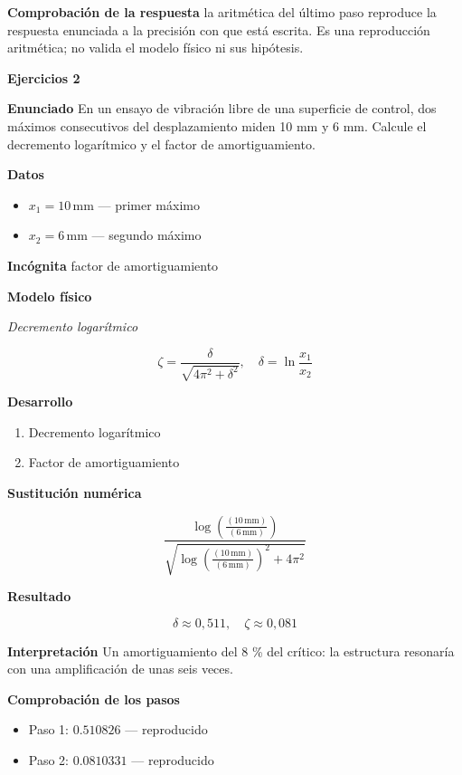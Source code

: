 \documentclass[10pt,openany]{book}
\begin{document}
\noindent\textbf{Comprobación de la respuesta} la aritmética del último paso reproduce la respuesta enunciada a la precisión con que está escrita. Es una reproducción aritmética; no valida el modelo físico ni sus hipótesis.

\noindent\textbf{Ejercicios 2}

\noindent\textbf{Enunciado}
En un ensayo de vibración libre de una superficie de control, dos máximos consecutivos del desplazamiento miden 10 mm y 6 mm. Calcule el decremento logarítmico y el factor de amortiguamiento.

\noindent\textbf{Datos}
\begin{itemize}
\item $x_{1} = 10\,\mathrm{mm}$ — primer máximo
\item $x_{2} = 6\,\mathrm{mm}$ — segundo máximo
\end{itemize}

\noindent\textbf{Incógnita}
factor de amortiguamiento

\noindent\textbf{Modelo físico}

\noindent\textit{Decremento logarítmico}

\[
\zeta = \frac{\delta}{\sqrt{4\pi^{2} + \delta^{2}}},\quad \delta = \ln\frac{x_1}{x_2}
\]

\noindent\textbf{Desarrollo}
\begin{enumerate}
\item
Decremento logarítmico
\item
Factor de amortiguamiento
\end{enumerate}

\noindent\textbf{Sustitución numérica}

\[
\frac{\log{\left(\frac{\left(10\,\mathrm{mm}\right)}{\left(6\,\mathrm{mm}\right)} \right)}}{\sqrt{\log{\left(\frac{\left(10\,\mathrm{mm}\right)}{\left(6\,\mathrm{mm}\right)} \right)}^{2} + 4 \pi^{2}}}
\]

\noindent\textbf{Resultado}

\[
\delta \approx 0{,}511,\quad \zeta \approx 0{,}081
\]

\noindent\textbf{Interpretación}
Un amortiguamiento del 8 \% del crítico: la estructura resonaría con una amplificación de unas seis veces.

\noindent\textbf{Comprobación de los pasos}
\begin{itemize}
\item Paso 1: $0.510826$ — reproducido
\item Paso 2: $0.0810331$ — reproducido
\end{itemize}
\end{document}
